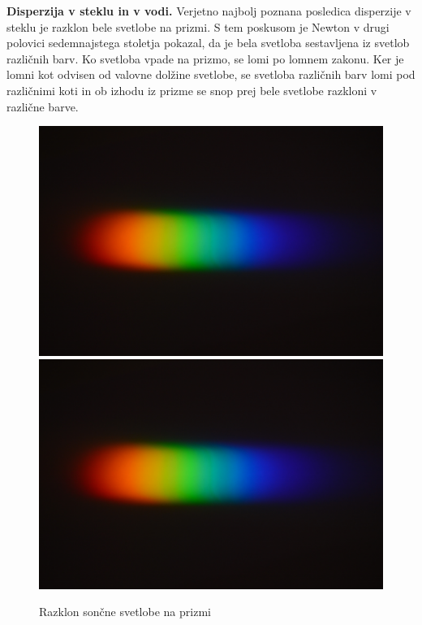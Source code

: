 \begin{example}{\bf Disperzija v steklu in v vodi.}
Verjetno najbolj poznana posledica disperzije v steklu je razklon bele svetlobe
na prizmi. S tem poskusom je Newton v drugi polovici sedemnajstega stoletja
pokazal, da je bela svetloba sestavljena iz svetlob različnih barv. Ko
svetloba vpade na prizmo, se lomi po lomnem zakonu. Ker je lomni kot odvisen
od valovne dolžine svetlobe, se svetloba različnih barv lomi pod različnimi
koti in ob izhodu iz prizme se snop prej bele svetlobe razkloni v različne
barve.
\begin{figure}[ht]
\centering
\includegraphics[width=7truecm]{slike/09_prizma.jpg}\hfill
\includegraphics[width=7truecm]{slike/09_prizma.jpg}
\caption{Razklon sončne svetlobe na prizmi}
\label{fig:09_prizma}
\end{figure}
 

\end{example}

